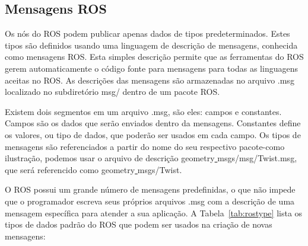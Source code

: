 \subsection{Mensagens ROS}
Os nós do ROS podem publicar apenas dados de tipos predeterminados. Estes tipos são definidos usando uma linguagem de descrição de mensagens, conhecida como mensagens ROS\@. Esta simples descrição permite que as ferramentas do ROS gerem automaticamente o código fonte para mensagens para todas as linguagens aceitas no ROS\@. As descrições das mensagens são armazenadas no arquivo .msg localizado no subdiretório msg/ dentro de um pacote ROS\@.

Existem dois segmentos em um arquivo .msg, são eles: campos e constantes. Campos são os dados que serão enviados dentro da mensagens. Constantes define os valores, ou tipo de dados, que poderão ser usados em cada campo. Os tipos de mensagens são referenciados a partir do nome do seu respectivo pacote-como ilustração, podemos usar o arquivo de descrição geometry\underline{ }msgs/msg/Twist.msg, que será referencido como geometry\underline{ }msgs/Twist. 

O ROS possui um grande número de mensagens predefinidas, o que não impede que o programador escreva seus próprios arquivos .msg com a descrição de uma mensagem específica para atender a sua aplicação. A Tabela~\ref{tab:rostype} lista os tipos de dados padrão do ROS que podem ser usados na criação de novas mensagens: 

